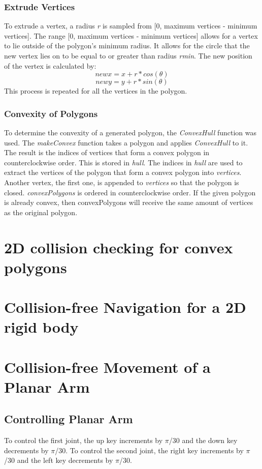 \documentclass{article}
\begin{document}
\subsubsection{Extrude Vertices}
To extrude a vertex, a radius \textit{r} is sampled from [0, maximum vertices - minimum vertices]. The range [0, maximum vertices - minimum vertices] allows for a vertex to lie outside of the polygon's minimum radius. It allows for the circle that the new vertex lies on to be equal to or greater than radius \textit{rmin}. The new position of the vertex is calculated by: 
    \[new x = x + r*cos(\theta)\]
    \[new y = y + r*sin(\theta)\]
This process is repeated for all the vertices in the polygon. 
\subsubsection{Convexity of Polygons}
To determine the convexity of a generated polygon, the \textit{ConvexHull} function was used. The \textit{makeConvex} function takes a polygon and applies \textit{ConvexHull} to it. The result is the indices of vertices that form a convex polygon in counterclockwise order. This is stored in \textit{hull}. The indices in \textit{hull} are used to extract the vertices of the polygon that form a convex polygon into \textit{vertices}. Another vertex, the first one, is appended to \textit{vertices} so that the polygon is closed. \textit{convexPolygons} is ordered in counterclockwise order. If the given polygon is already convex, then convexPolygons will receive the same amount of vertices as the original polygon. 

\section{2D collision checking for convex polygons}
\section{Collision-free Navigation for a 2D rigid body}
\section{Collision-free Movement of a Planar Arm}
\subsection{Controlling Planar Arm}
To control the first joint, the up key increments by $\pi$/30 and the down key decrements by $\pi$/30. To control the second joint, the right key increments by $\pi$/30 and the left key decrements by $\pi$/30.
\end{document}
